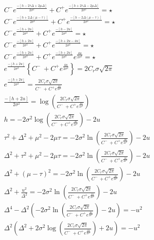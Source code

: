 \begin{equation}
    \begin{split}
         C^{-}e^{\frac{-[h-2\tau\Delta+2\mu\Delta]}{2\sigma^2}} + 
         C^{+}e^{\frac{-[h+2\tau\Delta-2\mu\Delta]}{2\sigma^2}}= \star\\
         C^{-}e^{\frac{-[h+2\Delta(\mu-\tau)]}{2\sigma^2}} + 
         C^{+}e^{\frac{-[h-2\Delta(\mu-\tau)]}{2\sigma^2}} =\star\\
         C^{-}e^{\frac{-[h+2u]}{2\sigma^2}} +
         C^{+}e^{\frac{-[h-2u]}{2\sigma^2}} = \star\\
         C^{-}e^{\frac{-[h+2u]}{2\sigma^2}} +
         C^{+}e^{\frac{-[h+2u-4u]}{2\sigma^2}} = \star\\
         C^{-}e^{\frac{-[h+2u]}{2\sigma^2}} +
         C^{+}e^{\frac{-[h+2u]}{2\sigma^2}} e^{\frac{4u}{2\sigma^2}} =
         \star \\
         e^{\frac{-[h+2u]}{2\sigma^2}} \left\{ C^-\ +C^+e^\frac{4u}{2\sigma^2} \right\} = 2C_r\sigma\sqrt{2\pi}\\
         e^{\frac{-[h+2u]}{2\sigma^2}} = \frac{2C_r\sigma\sqrt{2\pi}}{C^-\ +C^+e^\frac{4u}{2\sigma^2}}\\
         \frac{-[h+2u]}{2\sigma^2} = \log{\left( \frac{2C_r\sigma\sqrt{2\pi}}{C^-\ +C^+e^\frac{4u}{2\sigma^2}} \right)}\\
         h=-2\sigma^2\log{\left(\frac{2C_r\sigma\sqrt{2\pi}}{C^-\ +C^+e^\frac{4u}{2\sigma^2}}\right)}-2u \\
         \tau^2+ \Delta^2+\mu^2-2\mu\tau = -2\sigma^2\ln{\left(\frac{2C_r\sigma\sqrt{2\pi}}{C^-\ +C^+e^\frac{4u}{2\sigma^2}}\right)}-2u\\
         \Delta^2 + \tau^2 + \mu^2 -2\mu\tau= -2\sigma^2\ln{\left(\frac{2C_r\sigma\sqrt{2\pi}}{C^-\ +C^+e^\frac{4u}{2\sigma^2}}\right)}-2u\\
         \Delta^2 + (\mu-\tau)^2 = -2\sigma^2\ln{\left(\frac{2C_r\sigma\sqrt{2\pi}}{C^-\ +C^+e^\frac{4u}{2\sigma^2}}\right)}-2u\\
         \Delta^2 +\frac{u^2}{\Delta^2} = -2\sigma^2\ln{\left(\frac{2C_r\sigma\sqrt{2\pi}}{C^-\ +C^+e^\frac{4u}{2\sigma^2}}\right)}-2u \\
         \Delta^4 - \Delta^2 \left(-2\sigma^2\ln{\left(\frac{2C_r\sigma\sqrt{2\pi}}{C^-\ +C^+e^\frac{4u}{2\sigma^2}}\right)}-2u\right) = -u^2\\
         \Delta^2\left( \Delta^2 + 2\sigma^2\log{\left(\frac{2C_r\sigma\sqrt{2\pi}}{C^-\ +C^+e^\frac{4u}{2\sigma^2}}\right)}+2u \right) = -u^2\\
    \end{split}
\end{equation}

